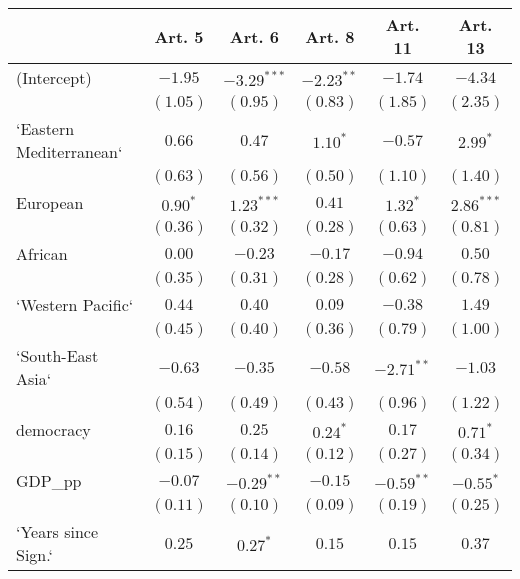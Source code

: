 
\begin{table}[!h]
\begin{center}
\begin{tabular}{l c c c c c }
\toprule
 & Art. 5 & Art. 6 & Art. 8 & Art. 11 & Art. 13 \\
\midrule
(Intercept)             & $-1.95$      & $-3.29^{***}$ & $-2.23^{**}$ & $-1.74$      & $-4.34$      \\
                        & $(1.05)$     & $(0.95)$      & $(0.83)$     & $(1.85)$     & $(2.35)$     \\
`Eastern Mediterranean` & $0.66$       & $0.47$        & $1.10^{*}$   & $-0.57$      & $2.99^{*}$   \\
                        & $(0.63)$     & $(0.56)$      & $(0.50)$     & $(1.10)$     & $(1.40)$     \\
European                & $0.90^{*}$   & $1.23^{***}$  & $0.41$       & $1.32^{*}$   & $2.86^{***}$ \\
                        & $(0.36)$     & $(0.32)$      & $(0.28)$     & $(0.63)$     & $(0.81)$     \\
African                 & $0.00$       & $-0.23$       & $-0.17$      & $-0.94$      & $0.50$       \\
                        & $(0.35)$     & $(0.31)$      & $(0.28)$     & $(0.62)$     & $(0.78)$     \\
`Western Pacific`       & $0.44$       & $0.40$        & $0.09$       & $-0.38$      & $1.49$       \\
                        & $(0.45)$     & $(0.40)$      & $(0.36)$     & $(0.79)$     & $(1.00)$     \\
`South-East Asia`       & $-0.63$      & $-0.35$       & $-0.58$      & $-2.71^{**}$ & $-1.03$      \\
                        & $(0.54)$     & $(0.49)$      & $(0.43)$     & $(0.96)$     & $(1.22)$     \\
democracy               & $0.16$       & $0.25$        & $0.24^{*}$   & $0.17$       & $0.71^{*}$   \\
                        & $(0.15)$     & $(0.14)$      & $(0.12)$     & $(0.27)$     & $(0.34)$     \\
GDP\_pp                 & $-0.07$      & $-0.29^{**}$  & $-0.15$      & $-0.59^{**}$ & $-0.55^{*}$  \\
                        & $(0.11)$     & $(0.10)$      & $(0.09)$     & $(0.19)$     & $(0.25)$     \\
`Years since Sign.`     & $0.25$       & $0.27^{*}$    & $0.15$       & $0.15$       & $0.37$       \\

\end{tabular}
\end{center}
\end{table}
